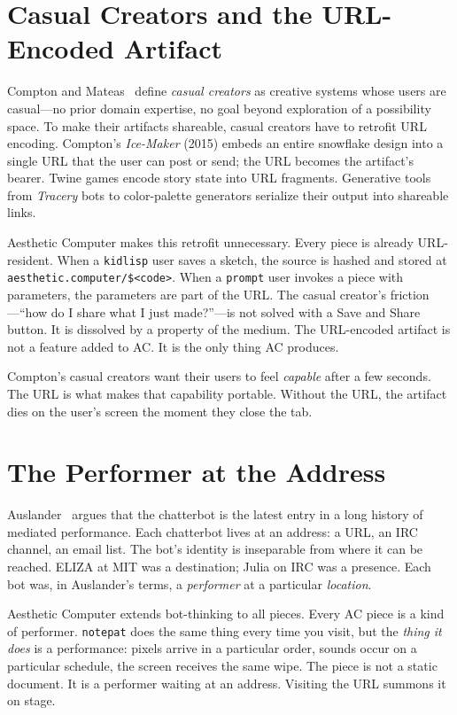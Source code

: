 \documentclass[10pt,letterpaper,twocolumn]{article}
\newcommand{\code}[1]{\texttt{#1}}
\begin{document}
\section{Casual Creators and the URL-Encoded Artifact}

Compton and Mateas~\citep{compton2015casual} define \emph{casual creators} as creative systems whose users are casual---no prior domain expertise, no goal beyond exploration of a possibility space. To make their artifacts shareable, casual creators have to retrofit URL encoding. Compton's \emph{Ice-Maker} (2015) embeds an entire snowflake design into a single URL that the user can post or send; the URL becomes the artifact's bearer. Twine games encode story state into URL fragments. Generative tools from \emph{Tracery} bots to color-palette generators serialize their output into shareable links.

Aesthetic Computer makes this retrofit unnecessary. Every piece is already URL-resident. When a \code{kidlisp} user saves a sketch, the source is hashed and stored at \code{aesthetic.computer/\$<code>}. When a \code{prompt} user invokes a piece with parameters, the parameters are part of the URL. The casual creator's friction---``how do I share what I just made?''---is not solved with a Save and Share button. It is dissolved by a property of the medium. The URL-encoded artifact is not a feature added to AC. It is the only thing AC produces.

Compton's casual creators want their users to feel \emph{capable} after a few seconds. The URL is what makes that capability portable. Without the URL, the artifact dies on the user's screen the moment they close the tab.

\section{The Performer at the Address}

Auslander~\citep{auslander2002cyberspace} argues that the chatterbot is the latest entry in a long history of mediated performance. Each chatterbot lives at an address: a URL, an IRC channel, an email list. The bot's identity is inseparable from where it can be reached. ELIZA at MIT was a destination; Julia on IRC was a presence. Each bot was, in Auslander's terms, a \emph{performer} at a particular \emph{location}.

Aesthetic Computer extends bot-thinking to all pieces. Every AC piece is a kind of performer. \code{notepat} does the same thing every time you visit, but the \emph{thing it does} is a performance: pixels arrive in a particular order, sounds occur on a particular schedule, the screen receives the same wipe. The piece is not a static document. It is a performer waiting at an address. Visiting the URL summons it on stage.
\end{document}
